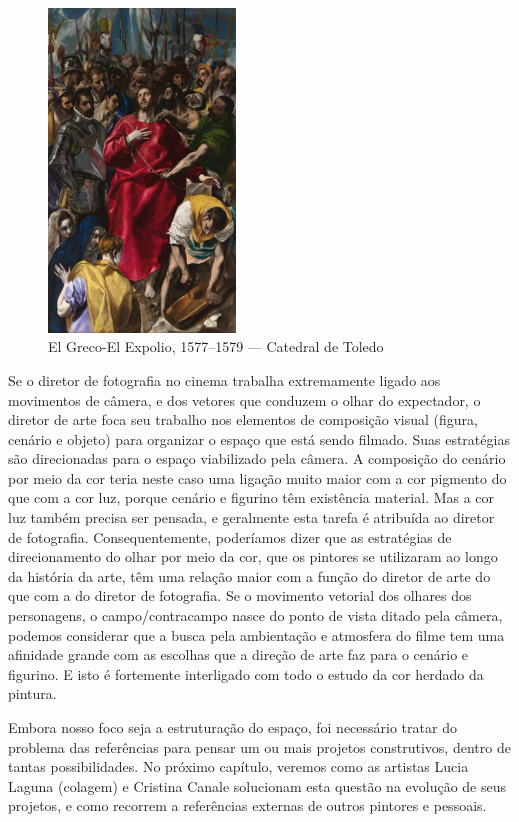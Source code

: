 \begin{figure}
	\caption{El Greco-El Expolio, 1577--1579 --- Catedral de Toledo}
	\includegraphics[width=1.96377in,height=3.38261in]{figuras/greco-el-explio.pdf.compressed.pdf}
\end{figure}

Se o diretor de fotografia no cinema trabalha extremamente ligado aos
movimentos de câmera, e dos vetores que conduzem o olhar do expectador,
o diretor de arte foca seu trabalho nos elementos de composição visual
(figura, cenário e objeto) para organizar o espaço que está sendo
filmado. Suas estratégias são direcionadas para o espaço viabilizado
pela câmera. A composição do cenário por meio da cor teria neste caso
uma ligação muito maior com a cor pigmento do que com a cor luz, porque
cenário e figurino têm existência material. Mas a cor luz também
precisa ser pensada, e geralmente esta tarefa é atribuída ao diretor de
fotografia. Consequentemente, poderíamos dizer que as estratégias de
direcionamento do olhar por meio da cor, que os pintores se utilizaram
ao longo da história da arte, têm uma relação maior com a função do
diretor de arte do que com a do diretor de fotografia. Se o movimento
vetorial dos olhares dos personagens, o campo/contracampo nasce do
ponto de vista ditado pela câmera, podemos considerar que a busca pela
ambientação e atmosfera do filme tem uma afinidade grande com as
escolhas que a direção de arte faz para o cenário e figurino. E isto é
fortemente interligado com todo o estudo da cor herdado da pintura.


Embora nosso foco seja a estruturação do espaço, foi necessário tratar
do problema das referências para pensar um ou mais projetos
construtivos, dentro de tantas possibilidades. No próximo capítulo,
veremos como as artistas Lucia Laguna (colagem) e Cristina Canale
solucionam esta questão na evolução de seus projetos, e como recorrem a
referências externas de outros pintores e pessoais.
